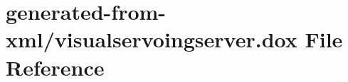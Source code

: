 \hypertarget{visualservoingserver_8dox}{}\section{generated-\/from-\/xml/visualservoingserver.dox File Reference}
\label{visualservoingserver_8dox}
